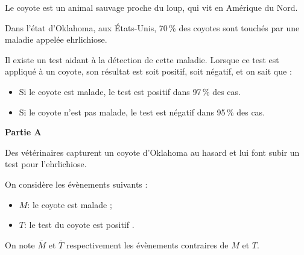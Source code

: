\medskip

Le coyote est un animal sauvage proche du loup, qui vit en Amérique du Nord.

Dans l'état d'Oklahoma, aux États-Unis, 70\,\% des coyotes sont touchés par une maladie appelée ehrlichiose.

Il existe un test aidant à la détection de cette maladie. Lorsque ce test est appliqué à un coyote, son résultat est soit positif, soit négatif, et on sait que :

\setlength\parindent{1cm}
\begin{itemize}
\item[$\bullet~~$] Si le coyote est malade, le test est positif dans 97\,\% des cas.
\item[$\bullet~~$] Si le coyote n'est pas malade, le test est négatif dans 95\,\% des cas.
\end{itemize}
\setlength\parindent{0cm}

\bigskip

\textbf{Partie A}

\medskip

Des vétérinaires capturent un coyote d'Oklahoma au hasard et lui font subir un test pour l'ehrlichiose.

On considère les évènements suivants :

\setlength\parindent{1cm}
\begin{itemize}
\item[$\bullet~~$]$M$: \og le coyote est malade \fg;
\item[$\bullet~~$]$T$: \og le test du coyote est positif \fg.
\end{itemize}
\setlength\parindent{0cm}

On note $\overline{M}$ et $\overline{T}$ respectivement les évènements contraires de $M$ et $T$.

\medskip

